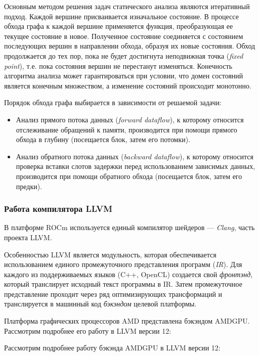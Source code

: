\documentclass[a4paper,14pt]{extarticle}
\newenvironment{ul}{\begin{itemize}[noitemsep,topsep=0em]}{\end{itemize}\vspace{4mm}}
\begin{document}
Основным методом решения задач статического анализа являются итеративный подход\cite[Глава~8]{compilers}.
Каждой вершине присваивается изначальное состояние. В процессе обхода графа к каждой вершине
применяется функция, преобразующая ее текущее состояние в новое. Полученное состояние
соединяется с состоянием последующих вершин в направлении обхода, образуя их новые состояния.
Обход продолжается до тех пор, пока не будет достигнута неподвижная точка (\textit{fixed point}), т.е.
пока состояния вершин не перестанут изменяться. Конечность алгоритма анализа может гарантироваться
при условии, что домен состояний является конечным множеством, а изменение состояний происходит монотонно.

Порядок обхода графа выбирается в зависимости от решаемой задачи:
\begin{ul}
\item Анализ прямого потока данных (\textit{forward dataflow}), к которому относится отслеживание обращений
к памяти, производится при помощи прямого обхода в глубину (посещается блок, затем его потомки).
\item Анализ обратного потока данных (\textit{backward dataflow}), к которому относится проверка вставки
слотов задержки перед использованием зависимых данных, производится при помощи обратного обхода
(посещается блок, затем его предки).
\end{ul}

\subsubsection{Работа компилятора LLVM}

В платформе ROCm используется единый компилятор шейдеров — \textit{Clang}, часть проекта LLVM. 

Особенностью LLVM является модульность, которая обеспечивается использованием единого промежуточного
представления программ (\textit{IR}). Для каждого из поддерживаемых языков (C++, OpenCL) создается
свой \textit{фронтэнд}, который транслирует исходный текст программы в IR. Затем промежуточное
представление проходит через ряд оптимизирующих трансформаций и транслируется в машинный код
\textit{бэкэндом} целевой платформы.

Платформа графических процессоров AMD представлена бэкэндом AMDGPU. Рассмотрим подробнее
его работу в LLVM версии 12:

Рассмотрим подробнее работу бэкэнда AMDGPU в LLVM версии 12:\\
\end{document}
